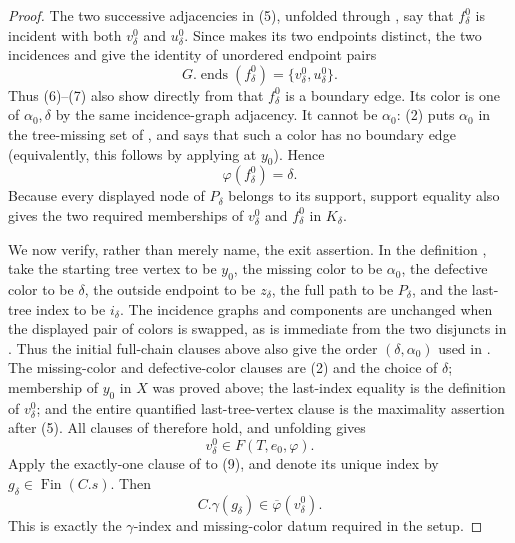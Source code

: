 \begin{proof}
The two successive adjacencies in (5), unfolded through
, say that $f^0_\delta$ is incident with
both $v^0_\delta$ and $u^0_\delta$.  Since
 makes its two endpoints distinct, the two
incidences and  give the identity of unordered endpoint
pairs
\[
 G.\operatorname{ends}(f^0_\delta)
    =\{v^0_\delta,u^0_\delta\}. \tag{7}
\]
Thus (6)--(7) also show directly from  that
$f^0_\delta$ is a boundary edge.  Its color is one of
$\alpha _0,\delta$ by the same incidence-graph adjacency.  It cannot be
$\alpha _0$: (2) puts $\alpha _0$ in the tree-missing set of
, and
 says that such a color has no
boundary edge (equivalently, this follows by applying
 at $y_0$).  Hence
\[
 \varphi(f^0_\delta)=\delta. \tag{8}
\]
Because every displayed node of $P_\delta$ belongs to its support, support
equality also gives the two required memberships of $v^0_\delta$ and
$f^0_\delta$ in $K_\delta$.

We now verify, rather than merely name, the exit assertion.  In the
definition , take the starting tree vertex to
be $y_0$, the missing color to be $\alpha _0$, the defective color to be
$\delta$, the outside endpoint to be $z_\delta$, the full path to be
$P_\delta$, and the last-tree index to be $i_\delta$.  The incidence graphs
and components are unchanged when the displayed pair of colors is swapped,
as is immediate from the two disjuncts in
.  Thus the initial full-chain clauses
above also give the order $(\delta,\alpha _0)$ used in
.  The missing-color and defective-color clauses
are (2) and the choice of $\delta$; membership of $y_0$ in $X$ was proved
above; the last-index equality is the definition of $v^0_\delta$; and the
entire quantified last-tree-vertex clause is the maximality assertion after
(5).  All clauses of  therefore hold, and
unfolding  gives
\[
 v^0_\delta\in F(T,e_0,\varphi). \tag{9}
\]
Apply the exactly-one clause of
 to (9), and denote its unique index
by $g_\delta\in\operatorname{Fin}(C.s)$.  Then
\[
 C.\gamma(g_\delta)\in\overline\varphi(v^0_\delta). \tag{10}
\]
This is exactly the $\gamma$-index and missing-color datum required in the
setup.


\end{proof}
